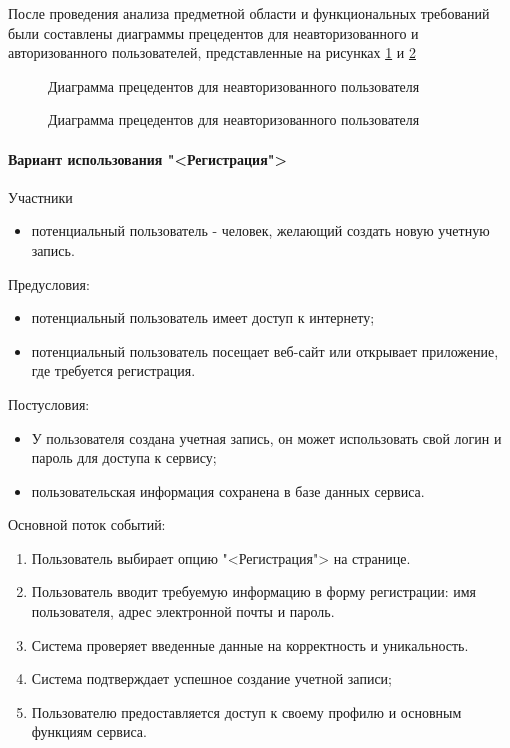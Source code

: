 После проведения анализа предметной области и функциональных требований были составлены диаграммы прецедентов для неавторизованного и авторизованного пользователей, представленные на рисунках \ref{uc_noauth:image} и \ref{uc_auth:image}
\vspace{1cm}
\begin{figure}[h]
	\caption{Диаграмма прецедентов для неавторизованного пользователя}
	\label{uc_noauth:image}
\end{figure}

\begin{figure}[h]
	\caption{Диаграмма прецедентов для неавторизованного пользователя}
	\label{uc_auth:image}
\end{figure}
\paragraph{Вариант использования "<Регистрация">}

Участники
\begin{itemize}
	\item потенциальный пользователь - человек, желающий создать новую учетную запись.
\end{itemize}

Предусловия:
\begin{itemize}
	\item потенциальный пользователь имеет доступ к интернету;
	\item потенциальный пользователь посещает веб-сайт или открывает приложение, где требуется регистрация.
\end{itemize}

Постусловия:
\begin{itemize}
	\item У пользователя создана учетная запись, он может использовать свой логин и пароль для доступа к сервису;
	\item пользовательская информация сохранена в базе данных сервиса.
\end{itemize}

Основной поток событий:
\begin{enumerate}
	\item Пользователь выбирает опцию "<Регистрация"> на странице.
	\item Пользователь вводит требуемую информацию в форму регистрации: имя пользователя, адрес электронной почты и пароль.
	\item Система проверяет введенные данные на корректность и уникальность.
	\item Система подтверждает успешное создание учетной записи;
	\item Пользователю предоставляется доступ к своему профилю и основным функциям сервиса.
\end{enumerate}

